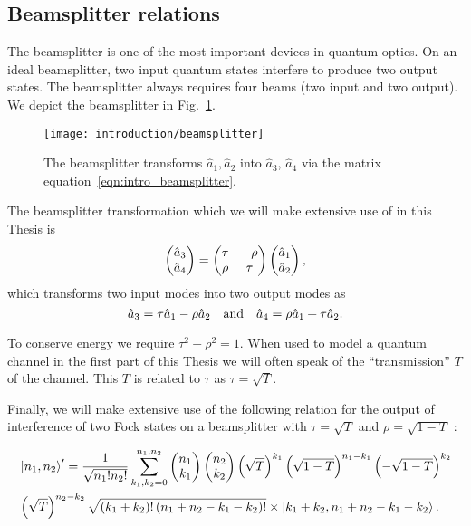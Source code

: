 \FloatBarrier
\subsection{Beamsplitter relations}
The beamsplitter is one of the most important devices in quantum optics. On an ideal beamsplitter, two input quantum states interfere to produce two output states. The beamsplitter always requires four beams (two input and two output). We depict the beamsplitter in Fig.~\ref{fig:intro_beamsplitter}. %


\begin{figure}[htp]
\centering
\captionsetup{width=0.8\linewidth}
\texttt{[image: introduction/beamsplitter]}
\caption{\label{fig:intro_beamsplitter} The beamsplitter transforms $\hat{a}_1, \hat{a}_2$ into $\hat{a}_3$, $\hat{a}_4$ via the matrix equation~\ref{eqn:intro_beamsplitter}.}
\end{figure}


The beamsplitter transformation which we will make extensive use of in this Thesis is
\begin{equation}\label{eqn:intro_beamsplitter}
\pmqty{\hat{a}_3 \\ \hat{a}_4} = \pmqty{\tau & -\rho \\  \rho & \tau} \pmqty{\hat{a}_1 \\ \hat{a}_2},
\end{equation}
which transforms two input modes into two output modes as
\begin{equation}
\hat{a}_3 = \tau \hat{a}_1 - \rho \hat{a}_2 \qq{and} \hat{a}_4 = \rho \hat{a}_1 + \tau \hat{a}_2.
\end{equation}

\noindent To conserve energy we require $\tau^2 + \rho^2 = 1$. When used to model a quantum channel in the first part of this Thesis we will often speak of the ``transmission'' $T$ of the channel. This $T$ is related to $\tau$ as $\tau = \sqrt{T}$. 

Finally, we will make extensive use of the following relation for the output of interference of two Fock states on a beamsplitter with $\tau = \sqrt{T}$ and $\rho  = \sqrt{1-T}$ \cite{Leonhardt2010}:

\begin{align}\label{eqn:intro_beamsplitter_fock}
&\ket{n_1, n_2}^\prime  = \frac{1}{\sqrt{n_1! n_2!}} \sum_{k_1, k_2=0}^{n_1, n_2} \pmqty{n_1 \\ k_1} \pmqty{n_2 \\ k_2} \left(\sqrt{T}\right)^{k_1} \left(\sqrt{1-T}\right)^{n_1 - k_1} \left(-\sqrt{1-T}\right)^{k_2} \notag \\
%
&\left(\sqrt{T}\right)^{n_2 - k_2} \sqrt{\left(k_1 + k_2\right)! \left(n_1 + n_2 - k_1 - k_2\right)!} \times \ket{k_1 + k_2, n_1 + n_2 - k_1 - k_2}.
\end{align}




